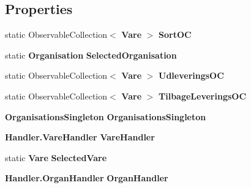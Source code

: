 \subsection*{Properties}
\begin{DoxyCompactItemize}
\item 
\mbox{\label{class_r_f_storage_1_1_view_model_1_1_organisation_v_m_a1ae36b2e139493e7ec379ad6c30133f2}} 
static Observable\+Collection$<$ \textbf{ Vare} $>$ {\bfseries Sort\+OC}\hspace{0.3cm}{\ttfamily  [get, set]}
\item 
\mbox{\label{class_r_f_storage_1_1_view_model_1_1_organisation_v_m_a3bc0fd69d72b25234a679fb7dd4a8a05}} 
static \textbf{ Organisation} {\bfseries Selected\+Organisation}\hspace{0.3cm}{\ttfamily  [get, set]}
\item 
\mbox{\label{class_r_f_storage_1_1_view_model_1_1_organisation_v_m_af9f0989e11bb09e3c7de40c62466d77e}} 
static Observable\+Collection$<$ \textbf{ Vare} $>$ {\bfseries Udleverings\+OC}\hspace{0.3cm}{\ttfamily  [get, set]}
\item 
\mbox{\label{class_r_f_storage_1_1_view_model_1_1_organisation_v_m_a745ab097a348ce7df72f719ab8494560}} 
static Observable\+Collection$<$ \textbf{ Vare} $>$ {\bfseries Tilbage\+Leverings\+OC}\hspace{0.3cm}{\ttfamily  [get, set]}
\item 
\mbox{\label{class_r_f_storage_1_1_view_model_1_1_organisation_v_m_a25a82522929ab2227932382f2f7c8433}} 
\textbf{ Organisations\+Singleton} {\bfseries Organisations\+Singleton}\hspace{0.3cm}{\ttfamily  [get, set]}
\item 
\mbox{\label{class_r_f_storage_1_1_view_model_1_1_organisation_v_m_a487f3319616fae4edd9da391de04d5a6}} 
\textbf{ Handler.\+Vare\+Handler} {\bfseries Vare\+Handler}\hspace{0.3cm}{\ttfamily  [get, set]}
\item 
\mbox{\label{class_r_f_storage_1_1_view_model_1_1_organisation_v_m_ae2925d7e9da88b338e4e2db10d4dd58b}} 
static \textbf{ Vare} {\bfseries Selected\+Vare}\hspace{0.3cm}{\ttfamily  [get, set]}
\item 
\mbox{\label{class_r_f_storage_1_1_view_model_1_1_organisation_v_m_a0a1bd4e80285b1459eeaf7ade9df022c}} 
\textbf{ Handler.\+Organ\+Handler} {\bfseries Organ\+Handler}\hspace{0.3cm}{\ttfamily  [get, set]}

\end{DoxyCompactItemize}
